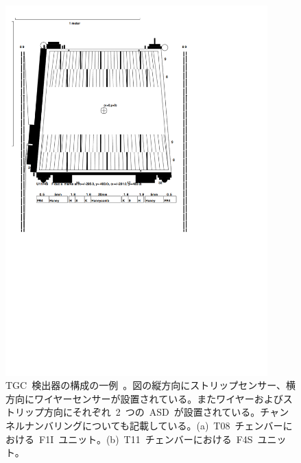 \begin{figure}[tbp]
\begin{minipage}{0.49\hsize}
        \includegraphics[width=0.9\textwidth]{img/pdf/u11f4s.pdf}
        \subcaption{}
        \end{minipage}
        \caption[TGC~検出器の構成の一例]{TGC~検出器の構成の一例~\cite{URL:04}。図の縦方向にストリップセンサー、横方向にワイヤーセンサーが設置されている。またワイヤーおよびストリップ方向にそれぞれ~2~つの~ASD~が設置されている。チャンネルナンバリングについても記載している。(a)~T08~チェンバーにおける~F1I~ユニット。(b)~T11~チェンバーにおける~F4S~ユニット。}
        \label{fig:tgcT}
\end{figure}

